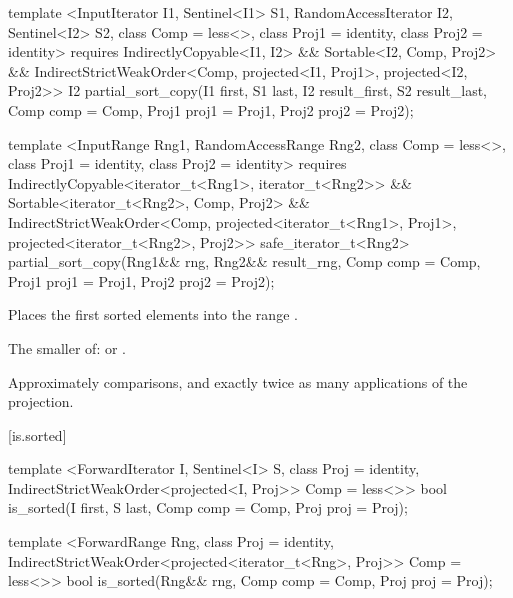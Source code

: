 %
\begin{itemdecl}
template <InputIterator I1, Sentinel<I1> S1, RandomAccessIterator I2, Sentinel<I2> S2,
    class Comp = less<>, class Proj1 = identity, class Proj2 = identity>
  requires IndirectlyCopyable<I1, I2> && Sortable<I2, Comp, Proj2> &&
      IndirectStrictWeakOrder<Comp, projected<I1, Proj1>, projected<I2, Proj2>>
  I2
    partial_sort_copy(I1 first, S1 last, I2 result_first, S2 result_last,
                      Comp comp = Comp{}, Proj1 proj1 = Proj1{}, Proj2 proj2 = Proj2{});

template <InputRange Rng1, RandomAccessRange Rng2, class Comp = less<>,
    class Proj1 = identity, class Proj2 = identity>
  requires IndirectlyCopyable<iterator_t<Rng1>, iterator_t<Rng2>> &&
      Sortable<iterator_t<Rng2>, Comp, Proj2> &&
      IndirectStrictWeakOrder<Comp, projected<iterator_t<Rng1>, Proj1>,
        projected<iterator_t<Rng2>, Proj2>>
  safe_iterator_t<Rng2>
    partial_sort_copy(Rng1&& rng, Rng2&& result_rng, Comp comp = Comp{},
                      Proj1 proj1 = Proj1{}, Proj2 proj2 = Proj2{});
\end{itemdecl}

\begin{itemdescr}
\pnum
\effects
Places the first
sorted elements into the range
.

\pnum
\returns
The smaller of:
 or
.

\pnum
\complexity
Approximately
comparisons, and exactly twice as many applications of the projection.
\end{itemdescr}

[is.sorted]{}

%
\begin{itemdecl}
template <ForwardIterator I, Sentinel<I> S, class Proj = identity,
    IndirectStrictWeakOrder<projected<I, Proj>> Comp = less<>>
  bool is_sorted(I first, S last, Comp comp = Comp{}, Proj proj = Proj{});

template <ForwardRange Rng, class Proj = identity,
    IndirectStrictWeakOrder<projected<iterator_t<Rng>, Proj>> Comp = less<>>
  bool
    is_sorted(Rng&& rng, Comp comp = Comp{}, Proj proj = Proj{});
\end{itemdecl}

